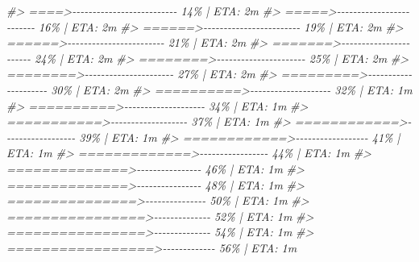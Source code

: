 \documentclass[
]{book}
\newenvironment{Shaded}{\begin{snugshade}}{\end{snugshade}}
\newcommand{\CommentTok}[1]{\textcolor[rgb]{0.56,0.35,0.01}{\textit{#1}}}
\begin{document}
\begin{Shaded}
\begin{Highlighting}[]
\CommentTok{\#\textgreater{}  ====\textgreater{}{-}{-}{-}{-}{-}{-}{-}{-}{-}{-}{-}{-}{-}{-}{-}{-}{-}{-}{-}{-}{-}{-}{-}{-}{-}{-}   14\% |  ETA:  2m}
\CommentTok{\#\textgreater{}  =====\textgreater{}{-}{-}{-}{-}{-}{-}{-}{-}{-}{-}{-}{-}{-}{-}{-}{-}{-}{-}{-}{-}{-}{-}{-}{-}{-}   16\% |  ETA:  2m}
\CommentTok{\#\textgreater{}  ======\textgreater{}{-}{-}{-}{-}{-}{-}{-}{-}{-}{-}{-}{-}{-}{-}{-}{-}{-}{-}{-}{-}{-}{-}{-}{-}   19\% |  ETA:  2m}
\CommentTok{\#\textgreater{}  ======\textgreater{}{-}{-}{-}{-}{-}{-}{-}{-}{-}{-}{-}{-}{-}{-}{-}{-}{-}{-}{-}{-}{-}{-}{-}{-}   21\% |  ETA:  2m}
\CommentTok{\#\textgreater{}  =======\textgreater{}{-}{-}{-}{-}{-}{-}{-}{-}{-}{-}{-}{-}{-}{-}{-}{-}{-}{-}{-}{-}{-}{-}{-}   24\% |  ETA:  2m}
\CommentTok{\#\textgreater{}  ========\textgreater{}{-}{-}{-}{-}{-}{-}{-}{-}{-}{-}{-}{-}{-}{-}{-}{-}{-}{-}{-}{-}{-}{-}   25\% |  ETA:  2m}
\CommentTok{\#\textgreater{}  ========\textgreater{}{-}{-}{-}{-}{-}{-}{-}{-}{-}{-}{-}{-}{-}{-}{-}{-}{-}{-}{-}{-}{-}{-}   27\% |  ETA:  2m}
\CommentTok{\#\textgreater{}  =========\textgreater{}{-}{-}{-}{-}{-}{-}{-}{-}{-}{-}{-}{-}{-}{-}{-}{-}{-}{-}{-}{-}{-}   30\% |  ETA:  2m}
\CommentTok{\#\textgreater{}  ==========\textgreater{}{-}{-}{-}{-}{-}{-}{-}{-}{-}{-}{-}{-}{-}{-}{-}{-}{-}{-}{-}{-}   32\% |  ETA:  1m}
\CommentTok{\#\textgreater{}  ==========\textgreater{}{-}{-}{-}{-}{-}{-}{-}{-}{-}{-}{-}{-}{-}{-}{-}{-}{-}{-}{-}{-}   34\% |  ETA:  1m}
\CommentTok{\#\textgreater{}  ===========\textgreater{}{-}{-}{-}{-}{-}{-}{-}{-}{-}{-}{-}{-}{-}{-}{-}{-}{-}{-}{-}   37\% |  ETA:  1m}
\CommentTok{\#\textgreater{}  ============\textgreater{}{-}{-}{-}{-}{-}{-}{-}{-}{-}{-}{-}{-}{-}{-}{-}{-}{-}{-}   39\% |  ETA:  1m}
\CommentTok{\#\textgreater{}  ============\textgreater{}{-}{-}{-}{-}{-}{-}{-}{-}{-}{-}{-}{-}{-}{-}{-}{-}{-}{-}   41\% |  ETA:  1m}
\CommentTok{\#\textgreater{}  =============\textgreater{}{-}{-}{-}{-}{-}{-}{-}{-}{-}{-}{-}{-}{-}{-}{-}{-}{-}   44\% |  ETA:  1m}
\CommentTok{\#\textgreater{}  ==============\textgreater{}{-}{-}{-}{-}{-}{-}{-}{-}{-}{-}{-}{-}{-}{-}{-}{-}   46\% |  ETA:  1m}
\CommentTok{\#\textgreater{}  ==============\textgreater{}{-}{-}{-}{-}{-}{-}{-}{-}{-}{-}{-}{-}{-}{-}{-}{-}   48\% |  ETA:  1m}
\CommentTok{\#\textgreater{}  ===============\textgreater{}{-}{-}{-}{-}{-}{-}{-}{-}{-}{-}{-}{-}{-}{-}{-}   50\% |  ETA:  1m}
\CommentTok{\#\textgreater{}  ================\textgreater{}{-}{-}{-}{-}{-}{-}{-}{-}{-}{-}{-}{-}{-}{-}   52\% |  ETA:  1m}
\CommentTok{\#\textgreater{}  ================\textgreater{}{-}{-}{-}{-}{-}{-}{-}{-}{-}{-}{-}{-}{-}{-}   54\% |  ETA:  1m}
\CommentTok{\#\textgreater{}  =================\textgreater{}{-}{-}{-}{-}{-}{-}{-}{-}{-}{-}{-}{-}{-}   56\% |  ETA:  1m}

\end{Highlighting}
\end{Shaded}
\end{document}

